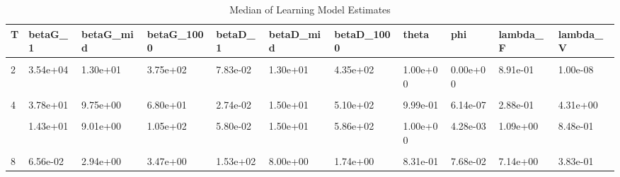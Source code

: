 \begin{table}[!h]
\centering
\caption{Median of Learning Model Estimates}
\centering
\begin{tabular}[t]{lllllllllll}
\toprule
T & betaG\_1 & betaG\_mid & betaG\_1000 & betaD\_1 & betaD\_mid & betaD\_1000 & theta & phi & lambda\_F & lambda\_V\\
\midrule
\cellcolor{gray!10}{1} & \cellcolor{gray!10}{3.81e-04} & \cellcolor{gray!10}{1.60e+01} & \cellcolor{gray!10}{2.38e+02} & \cellcolor{gray!10}{7.19e-09} & \cellcolor{gray!10}{3.80e+01} & \cellcolor{gray!10}{6.37e+02} & \cellcolor{gray!10}{1.00e+00} & \cellcolor{gray!10}{9.32e-01} & \cellcolor{gray!10}{2.42e+01} & \cellcolor{gray!10}{8.75e+05}\\
2 & 3.54e+04 & 1.30e+01 & 3.75e+02 & 7.83e-02 & 1.30e+01 & 4.35e+02 & 1.00e+00 & 0.00e+00 & 8.91e-01 & 1.00e-08\\
\cellcolor{gray!10}{3} & \cellcolor{gray!10}{1.82e-01} & \cellcolor{gray!10}{7.00e+00} & \cellcolor{gray!10}{1.17e+01} & \cellcolor{gray!10}{3.82e-03} & \cellcolor{gray!10}{3.33e+01} & \cellcolor{gray!10}{7.44e+01} & \cellcolor{gray!10}{9.78e-01} & \cellcolor{gray!10}{6.07e-01} & \cellcolor{gray!10}{4.77e+00} & \cellcolor{gray!10}{3.70e+05}\\
4 & 3.78e+01 & 9.75e+00 & 6.80e+01 & 2.74e-02 & 1.50e+01 & 5.10e+02 & 9.99e-01 & 6.14e-07 & 2.88e-01 & 4.31e+00\\
\cellcolor{gray!10}{5} & \cellcolor{gray!10}{5.20e+00} & \cellcolor{gray!10}{6.00e+00} & \cellcolor{gray!10}{2.42e+00} & \cellcolor{gray!10}{3.18e-01} & \cellcolor{gray!10}{9.06e+00} & \cellcolor{gray!10}{9.45e+00} & \cellcolor{gray!10}{9.08e-01} & \cellcolor{gray!10}{1.36e-05} & \cellcolor{gray!10}{1.07e+00} & \cellcolor{gray!10}{4.73e-01}\\
\addlinespace
6 & 1.43e+01 & 9.01e+00 & 1.05e+02 & 5.80e-02 & 1.50e+01 & 5.86e+02 & 1.00e+00 & 4.28e-03 & 1.09e+00 & 8.48e-01\\
\cellcolor{gray!10}{7} & \cellcolor{gray!10}{7.95e+00} & \cellcolor{gray!10}{2.74e+00} & \cellcolor{gray!10}{3.38e+00} & \cellcolor{gray!10}{2.50e+01} & \cellcolor{gray!10}{8.00e+00} & \cellcolor{gray!10}{1.41e+00} & \cellcolor{gray!10}{7.65e-01} & \cellcolor{gray!10}{8.93e-03} & \cellcolor{gray!10}{3.84e+00} & \cellcolor{gray!10}{1.22e-02}\\
8 & 6.56e-02 & 2.94e+00 & 3.47e+00 & 1.53e+02 & 8.00e+00 & 1.74e+00 & 8.31e-01 & 7.68e-02 & 7.14e+00 & 3.83e-01\\
\bottomrule
\end{tabular}
\end{table}